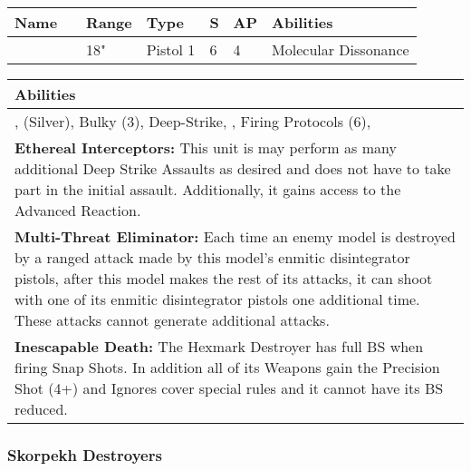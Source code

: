 \noindent
\begin{tabular}{||m{140pt} m{00pt} m{31pt} m{55pt} m{12pt} m{12pt} m{210pt}||}
	\hline
	Name & & Range & Type & S & AP & Abilities \\
	\hline
	\quickref{Enmitic Disintegrator Pistol} &  & 18" & Pistol 1 & 6 & 4 & Molecular Dissonance \\
	\hline
\end{tabular}

\noindent
\begin{tabular}{||m{532pt}||}
	\hline
	Abilities \\
	\hline
	\quickref{Annihilation Protocols}, \quickref{Awakening Protocols} (Silver), Bulky (3), Deep-Strike, \quickref{Hyperspace Hunters}, Firing Protocols (6), \quickref{Reanimation Protocols} \\
	\textbf{Ethereal Interceptors:} This unit is may perform as many additional Deep Strike Assaults as desired and does not have to take part in the initial assault. Additionally, it gains access to the \quickref{Ethereal Interception} Advanced Reaction. \\
	\textbf{Multi-Threat Eliminator:} Each time an enemy model is destroyed by a ranged attack made by this model's enmitic disintegrator pistols, after this model makes the rest of its attacks, it can shoot with one of its enmitic disintegrator pistols one additional time. These attacks cannot generate additional attacks. \\
	\textbf{Inescapable Death:} The Hexmark Destroyer has full BS when firing Snap Shots. In addition all of its Weapons gain the Precision Shot (4+) and Ignores cover special rules and it cannot have its BS reduced. \\
	\hline
\end{tabular}

\newpage
\subsubsection{Skorpekh Destroyers}

